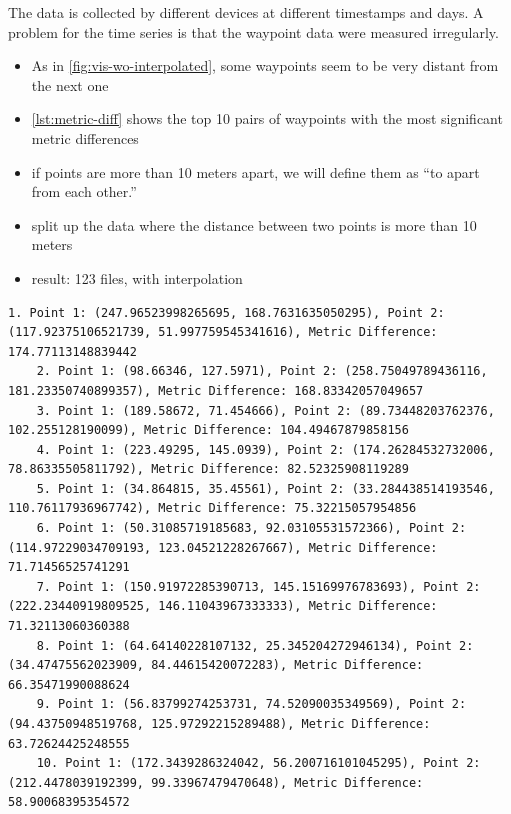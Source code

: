 The data is collected by different devices at different timestamps and days.
A problem for the time series is that the waypoint data were measured irregularly.
\begin{itemize}
    \item As in \cref{fig:vis-wo-interpolated}, some waypoints seem to be very distant from the next one
    \item \cref{lst:metric-diff} shows the top 10 pairs of waypoints with the most significant metric differences
    \item if points are more than 10 meters apart, we will define them as ``to apart from each other.''
    \item split up the data where the distance between two points is more than 10 meters
    \item result: 123 files, with interpolation
\end{itemize}

\begin{lstlisting}[caption={Top 10 pairs with the most significant metric differences},label={lst:metric-diff},captionpos=b]
    1. Point 1: (247.96523998265695, 168.7631635050295), Point 2: (117.92375106521739, 51.997759545341616), Metric Difference: 174.77113148839442
    2. Point 1: (98.66346, 127.5971), Point 2: (258.75049789436116, 181.23350740899357), Metric Difference: 168.83342057049657
    3. Point 1: (189.58672, 71.454666), Point 2: (89.73448203762376, 102.255128190099), Metric Difference: 104.49467879858156
    4. Point 1: (223.49295, 145.0939), Point 2: (174.26284532732006, 78.86335505811792), Metric Difference: 82.52325908119289
    5. Point 1: (34.864815, 35.45561), Point 2: (33.284438514193546, 110.76117936967742), Metric Difference: 75.32215057954856
    6. Point 1: (50.31085719185683, 92.03105531572366), Point 2: (114.97229034709193, 123.04521228267667), Metric Difference: 71.71456525741291
    7. Point 1: (150.91972285390713, 145.15169976783693), Point 2: (222.23440919809525, 146.11043967333333), Metric Difference: 71.32113060360388
    8. Point 1: (64.64140228107132, 25.345204272946134), Point 2: (34.47475562023909, 84.44615420072283), Metric Difference: 66.35471990088624
    9. Point 1: (56.83799274253731, 74.52090035349569), Point 2: (94.43750948519768, 125.97292215289488), Metric Difference: 63.72624425248555
    10. Point 1: (172.3439286324042, 56.200716101045295), Point 2: (212.4478039192399, 99.33967479470648), Metric Difference: 58.90068395354572
\end{lstlisting}

